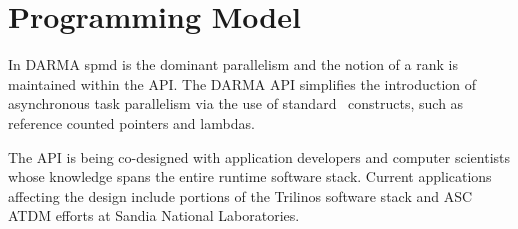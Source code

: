 \section{Programming Model}
\label{sec:programming_model}
In DARMA \gls{spmd} is the dominant parallelism and the notion of a \gls{rank}
is maintained within the \gls{API}.   
  The DARMA \gls{API} simplifies the introduction
  of asynchronous task parallelism via the use of standard \CC\ constructs, such
  as \gls{reference counted pointers} and \glspl{lambda}.

  
The \gls{API} is being \gls{co-design}ed with application developers
and computer scientists whose knowledge spans the entire runtime software stack.
Current applications affecting the design include portions of the \gls{Trilinos} software stack
and \gls{ASC} \gls{ATDM} efforts at Sandia National Laboratories. 
 



